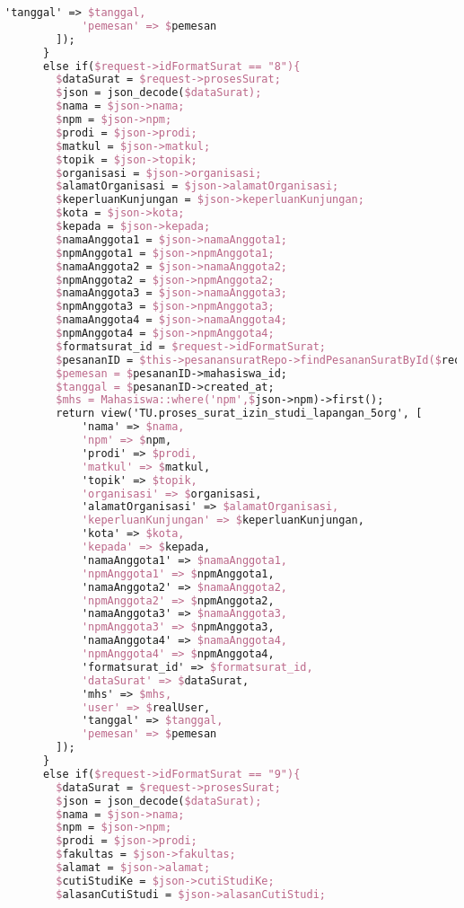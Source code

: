 \begin{lstlisting}[language=tex,basicstyle=\tiny,caption=PesanansuratController.php]
            'tanggal' => $tanggal,
            'pemesan' => $pemesan
        ]);
      }
      else if($request->idFormatSurat == "8"){
        $dataSurat = $request->prosesSurat;
        $json = json_decode($dataSurat);
        $nama = $json->nama;
        $npm = $json->npm;
        $prodi = $json->prodi;
        $matkul = $json->matkul;
        $topik = $json->topik;
        $organisasi = $json->organisasi;
        $alamatOrganisasi = $json->alamatOrganisasi;
        $keperluanKunjungan = $json->keperluanKunjungan;
        $kota = $json->kota;
        $kepada = $json->kepada;
        $namaAnggota1 = $json->namaAnggota1;
        $npmAnggota1 = $json->npmAnggota1;
        $namaAnggota2 = $json->namaAnggota2;
        $npmAnggota2 = $json->npmAnggota2;
        $namaAnggota3 = $json->namaAnggota3;
        $npmAnggota3 = $json->npmAnggota3;
        $namaAnggota4 = $json->namaAnggota4;
        $npmAnggota4 = $json->npmAnggota4;
        $formatsurat_id = $request->idFormatSurat;
        $pesananID = $this->pesanansuratRepo->findPesananSuratById($request->id);
        $pemesan = $pesananID->mahasiswa_id;
        $tanggal = $pesananID->created_at;
        $mhs = Mahasiswa::where('npm',$json->npm)->first();
        return view('TU.proses_surat_izin_studi_lapangan_5org', [
            'nama' => $nama,
            'npm' => $npm,
            'prodi' => $prodi,
            'matkul' => $matkul,
            'topik' => $topik,
            'organisasi' => $organisasi,
            'alamatOrganisasi' => $alamatOrganisasi,
            'keperluanKunjungan' => $keperluanKunjungan,
            'kota' => $kota,
            'kepada' => $kepada,
            'namaAnggota1' => $namaAnggota1,
            'npmAnggota1' => $npmAnggota1,
            'namaAnggota2' => $namaAnggota2,
            'npmAnggota2' => $npmAnggota2,
            'namaAnggota3' => $namaAnggota3,
            'npmAnggota3' => $npmAnggota3,
            'namaAnggota4' => $namaAnggota4,
            'npmAnggota4' => $npmAnggota4,
            'formatsurat_id' => $formatsurat_id,
            'dataSurat' => $dataSurat,
            'mhs' => $mhs,
            'user' => $realUser,
            'tanggal' => $tanggal,
            'pemesan' => $pemesan
        ]);
      }
      else if($request->idFormatSurat == "9"){
        $dataSurat = $request->prosesSurat;
        $json = json_decode($dataSurat);
        $nama = $json->nama;
        $npm = $json->npm;
        $prodi = $json->prodi;
        $fakultas = $json->fakultas;
        $alamat = $json->alamat;
        $cutiStudiKe = $json->cutiStudiKe;
        $alasanCutiStudi = $json->alasanCutiStudi;

\end{lstlisting}

